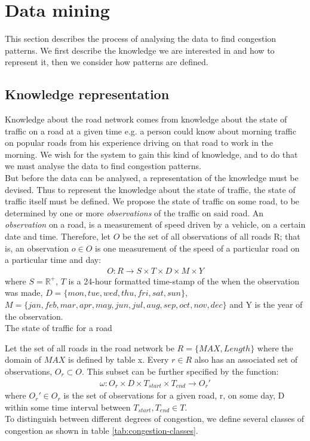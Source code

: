 \section{Data mining}
This section describes the process of analysing the data to find congestion patterns. We first describe the knowledge we are interested in and how to represent it, then we consider how patterns are defined.

\subsection{Knowledge representation}
Knowledge about the road network comes from knowledge about the state of traffic on a road at a given time e.g. a  person could know about morning traffic on popular roads from his experience driving on that road to work in the morning. We wish for the system to gain this kind of knowledge, and to do that we must analyse the data to find congestion patterns.\\
But before the data can be analysed, a representation of the knowledge must be devised. Thus to represent the knowledge about the state of traffic, the state of traffic itself must be defined. We propose the state of traffic on some road, to be determined by one or more \emph{observations} of the traffic on said road. An \emph{observation} on a road, is a measurement of speed driven by a vehicle, on a certain date and time. Therefore, let $O$ be the set of all observations of all roads R; that is, an observation $o \in O$ is one measurement of the speed of a particular road on a particular time and day:
\begin{align*}
O: R \rightarrow S \times T \times D \times M \times Y
\end{align*}
where $S = \mathbb R^{+}$, $T$ is a 24-hour formatted time-stamp of the when the observation was made, $D= \{mon, tue, wed, thu, fri, sat, sun\}$,\\ $M = \{jan, feb, mar, apr, may, jun, jul, aug, sep, oct, nov, dec\}$ and Y is the year of the observation. \\
The state of traffic for a road 


Let the set of all roads in the road network be $R = \{MAX, Length\}$ where the domain of $MAX$ is defined by table x. 
Every $r \in R$ also has an associated set of observations, $O_r \subset O $. This subset can be further specified by the function:
\begin{align*}
\omega: O_r \times D \times T_{start} \times T_{end} \rightarrow O_r'
\end{align*}
where $O_r' \in O_r$ is the set of observations for a given road, r, on some day, D within some time interval between $T_{start},T_{end} \in T$.\\
To distinguish between different degrees of congestion, 
we define several classes of congestion as shown in table \ref{tab:congestion-classes}. 

